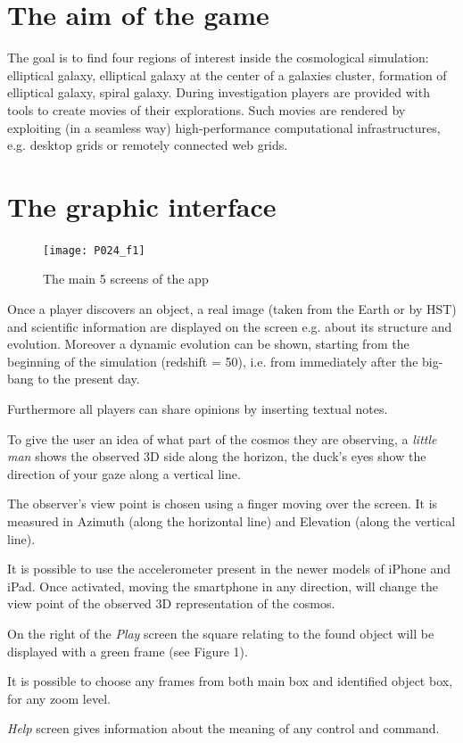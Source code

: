\documentclass[11pt,twoside]{article}
\begin{document}
\section{The aim of the game}
The goal is to find four regions of interest inside the cosmological simulation:  elliptical galaxy, elliptical galaxy at the center of a galaxies cluster,  formation of elliptical galaxy, spiral galaxy. During investigation players are provided with tools to create movies of their explorations. Such movies are rendered by exploiting (in a seamless way) high-performance computational infrastructures, e.g. desktop grids or remotely connected web grids.\par

\section{The graphic interface}
\begin{figure}[h!]
\centering
\texttt{[image: P024\_f1]}
\caption{The main 5 screens of the app}
\end{figure}
Once a player discovers an object, a real image (taken from the Earth or by HST) and scientific information are displayed on the screen e.g. about its structure and evolution. Moreover a dynamic evolution can be shown, starting from the beginning of the simulation (redshift = 50), i.e. from immediately after the big-bang to the present day.\par
Furthermore all players can share opinions by inserting textual notes. \par
To give the user an idea of what part of the cosmos they are observing, a \emph{little man} shows the observed  3D side along the horizon,  the duck's eyes show the direction of your gaze along a vertical line. \par
The observer's view point  is chosen using a finger moving over the screen. It is measured in Azimuth (along the horizontal line) and Elevation (along the vertical line).\par
It is possible to use the accelerometer present in the newer models of iPhone  and iPad. Once activated, moving the smartphone in any direction, will change the view point  of the observed 3D 
representation of the cosmos.\par
On the right of the \emph{Play} screen the square relating to the found object will be displayed with a 
green frame (see Figure 1).\par
It is possible to choose any frames from both main box and identified object box, for  any zoom level.\par
\emph{Help} screen gives information about the meaning of any control and command.
\end{document}
